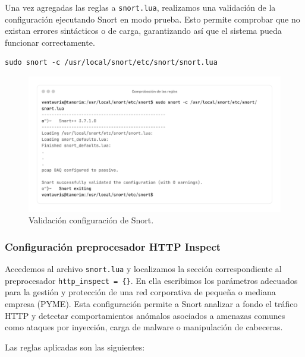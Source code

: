 \documentclass[11pt,a4paper,twoside]{report}
\begin{document}
Una vez agregadas las reglas a \texttt{snort.lua}, realizamos una validación de la configuración ejecutando Snort en modo prueba. Esto permite comprobar que no existan errores sintácticos o de carga, garantizando así que el sistema pueda funcionar correctamente.

\begin{lstlisting}[style=commandstyle, caption={Validación de la configuración final de Snort con reglas}]
	sudo snort -c /usr/local/snort/etc/snort/snort.lua
\end{lstlisting}

\begin{figure}[H]
	\centering
	\includegraphics[scale=0.12]{instalacion_reglas_snort/3-3.png}
	\caption{Validación configuración de Snort.}
\end{figure}

\newpage

\subsubsection*{Configuración preprocesador HTTP Inspect}

Accedemos al archivo \texttt{snort.lua} y localizamos la sección correspondiente al preprocesador \texttt{http\_inspect = \{\}}. En ella escribimos los parámetros adecuados para la gestión y protección de una red corporativa de pequeña o mediana empresa (PYME). Esta configuración permite a Snort analizar a fondo el tráfico HTTP y detectar comportamientos anómalos asociados a amenazas comunes como ataques por inyección, carga de malware o manipulación de cabeceras.

Las reglas aplicadas son las siguientes:
\newline
\end{document}
